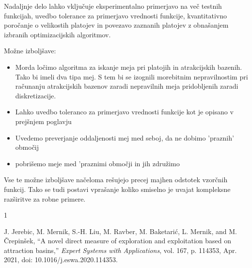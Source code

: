 \documentclass[12pt,a4paper]{article}
\begin{document}
Nadaljnje delo lahko vključuje eksperimentalno primerjavo na več testnih funkcijah, uvedbo tolerance za primerjavo vrednosti funkcije, kvantitativno poročanje o velikostih platojev in povezavo zaznanih platojev z obnašanjem izbranih optimizacijskih algoritmov.


Možne izboljšave:
\begin{itemize}
    \item Morda ločimo algoritma za iskanje meja pri platojih in atrakcijskih bazenih. Tako bi imeli dva tipa mej. S tem bi se izognili morebitnim nepravilnostim pri računanju atrakcijskih bazenov zaradi nepravilnih meja pridobljenih zaradi diskretizacije.
    \item Lahko uvedbo toleranco za primerjavo vrednosti funkcije kot je opisano v prejšnjem poglavju
    \item Uvedemo preverjanje oddaljenosti mej med seboj, da ne dobimo 'praznih' območij
    \item pobrišemo meje med 'praznimi območji in jih združimo
\end{itemize}

Vse te možne izboljšave načeloma rešujejo precej majhen odstotek vzorčnih funkcij. Tako se tudi postavi vprašanje koliko smiselno je uvajat kompleksne razširitve za robne primere.

\begin{thebibliography}{1}

J. Jerebic, M. Mernik, S.-H. Liu, M. Ravber, M. Baketarić, L. Mernik, and M. Črepinšek, ``A novel direct measure of exploration and exploitation based on attraction basins,'' \emph{Expert Systems with Applications}, vol. 167, p. 114353, Apr. 2021, doi: 10.1016/j.eswa.2020.114353.

\end{thebibliography}
\end{document}
